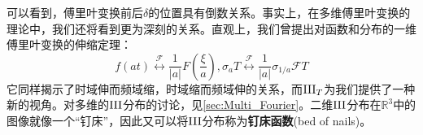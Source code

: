 可以看到，傅里叶变换前后$\delta$的位置具有倒数关系。事实上，在多维傅里叶变换的理论中，我们还将看到更为深刻的关系。直观上，我们曾提出对函数和分布的一维傅里叶变换的伸缩定理：
\[f(at)\overset{\mathcal{F} }{\longleftrightarrow}\frac{1}{|a|}F\left(\frac{\xi}{a}\right),\sigma_a T\overset{\mathcal{F} }{\longleftrightarrow}\frac{1}{|a|}\sigma_{1/a}\mathcal{F} T\]
它同样揭示了时域伸而频域缩，时域缩而频域伸的关系，而$\operatorname{III}_T$为我们提供了一种新的视角。对多维的$\operatorname{III}$分布的讨论，见\ref{sec:Multi_Fourier}。二维$\operatorname{III}$分布在$\mathbb{R}^3$中的图像就像一个“钉床”，因此又可以将$\operatorname{III}$分布称为\textbf{钉床函数}(bed of nails)。
